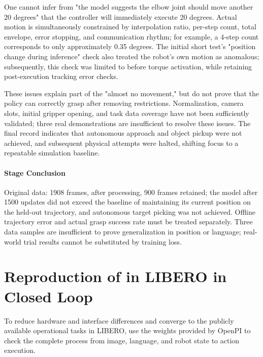 One cannot infer from "the model suggests the elbow joint should move another 20 degrees" that the controller will immediately execute 20 degrees. Actual motion is simultaneously constrained by interpolation ratio, per-step count, total envelope, error stopping, and communication rhythm; for example, a 4-step count corresponds to only approximately 0.35 degrees. The initial short test's "position change during inference" check also treated the robot's own motion as anomalous; subsequently, this check was limited to before torque activation, while retaining post-execution tracking error checks.

These issues explain part of the "almost no movement," but do not prove that the policy can correctly grasp after removing restrictions. Normalization, camera slots, initial gripper opening, and task data coverage have not been sufficiently validated; three real demonstrations are insufficient to resolve these issues. The final record indicates that autonomous approach and object pickup were not achieved, and subsequent physical attempts were halted, shifting focus to a repeatable simulation baseline.


\paragraph{Stage Conclusion} Original data: 1908 frames, after processing, 900 frames retained; the model after 1500 updates did not exceed the baseline of maintaining its current position on the held-out trajectory, and autonomous target picking was not achieved. Offline trajectory error and actual grasp success rate must be treated separately. Three data samples are insufficient to prove generalization in position or language; real-world trial results cannot be substituted by training loss.


\FloatBarrier

\section{Reproduction of \pifive{} in LIBERO in Closed Loop}

\label{stage:s08}

To reduce hardware and interface differences and converge to the publicly available operational tasks in LIBERO, use the \pifive{} weights provided by OpenPI to check the complete process from image, language, and robot state to action execution.

